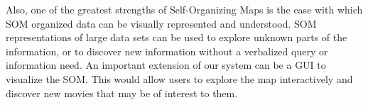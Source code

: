 \documentclass[conference]{IEEEtran}
\begin{document}
Also, one of the greatest strengths of Self-Organizing Maps is the ease with which SOM organized data can be visually represented and understood. SOM representations of large data sets can be used to explore unknown parts of the information, or to discover new information without a verbalized query or information need. An important extension of our system can be a GUI to visualize the SOM. This would allow users to explore the map interactively and discover new movies that may be of interest to them.



%
%



%
%
\end{document}
